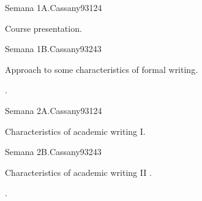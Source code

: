 \begin{syllabus}
\begin{competences}
    \item {}
    \item {}
    \item {}
\end{competences}


\begin{unit}{Semana 1A.}{}{Cassany93}{12}{4}
   \begin{topics}
      \item Course presentation.
   \end{topics}
   \begin{learningoutcomes}
      \item
   \end{learningoutcomes}
\end{unit}

\begin{unit}{Semana 1B.}{}{Cassany93}{24}{3}
   \begin{topics}
      \item Approach to some characteristics of formal writing.
   \end{topics}

   \begin{learningoutcomes}
      \item .
      \end{learningoutcomes}
\end{unit}

\begin{unit}{Semana 2A.}{}{Cassany93}{12}{4}
   \begin{topics}
      \item Characteristics of academic writing I.
   \end{topics}
   \begin{learningoutcomes}
      \item 
   \end{learningoutcomes}
\end{unit}

\begin{unit}{Semana 2B.}{}{Cassany93}{24}{3}
   \begin{topics}
      \item Characteristics of academic writing  II .
   \end{topics}

   \begin{learningoutcomes}
      \item . 
      \end{learningoutcomes}
\end{unit}


\end{syllabus}
